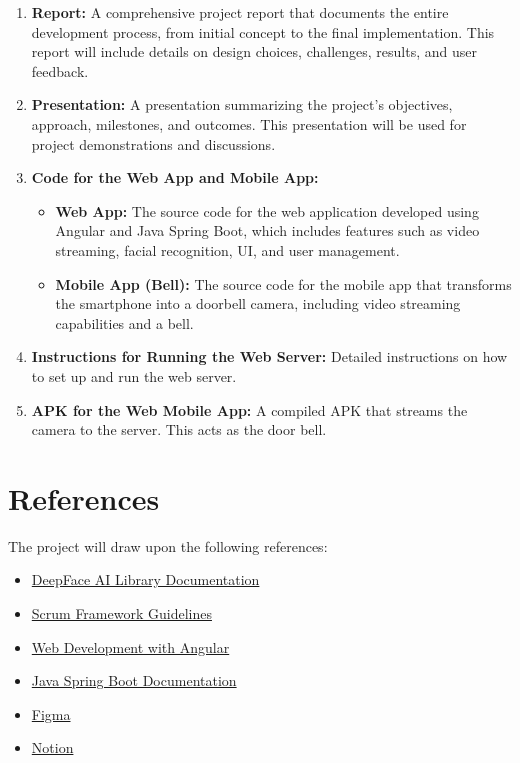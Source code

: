 \documentclass[a4 paper, 12pt]{article}
\begin{document}
\begin{enumerate}
    \item \textbf{Report:} A comprehensive project report that documents the entire development process, from initial concept to the final implementation. This report will include details on design choices, challenges, results, and user feedback.

    \item \textbf{Presentation:} A presentation summarizing the project's objectives, approach, milestones, and outcomes. This presentation will be used for project demonstrations and discussions.

    \item \textbf{Code for the Web App and Mobile App:}
        \begin{itemize}
            \item \textbf{Web App:} The source code for the web application developed using Angular and Java Spring Boot, which includes features such as video streaming, facial recognition, UI, and user management.
            \item \textbf{Mobile App (Bell):} The source code for the mobile app that transforms the smartphone into a doorbell camera, including video streaming capabilities and a bell.
        \end{itemize}

    \item \textbf{Instructions for Running the Web Server:} Detailed instructions on how to set up and run the web server.

    \item \textbf{APK for the Web Mobile App:} A compiled APK that streams the camera to the server. This acts as the door bell.
\end{enumerate}
\section{References}
The project will draw upon the following references:
\begin{itemize}

    \item \href{https://github.com/serengil/deepface}{DeepFace AI Library Documentation}
    \item \href{https://scrumguides.org/scrum-guide.html}{Scrum Framework Guidelines}
    \item \href{https://angular.io/docs}{Web Development with Angular}
    \item \href{https://docs.spring.io/spring-boot/docs/current/reference/htmlsingle/}{Java Spring Boot Documentation}
    \item \href{https://www.figma.com/}{Figma}
    \item \href{https://notion.so}{Notion}
\end{itemize}
\end{document}
